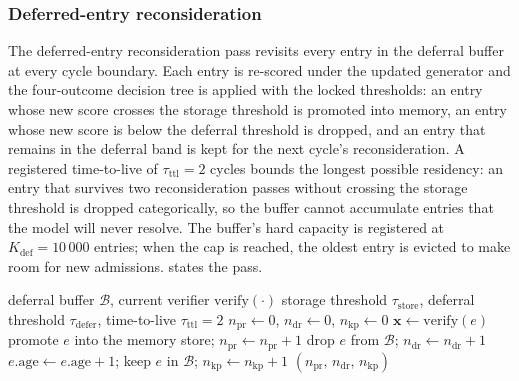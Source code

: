 \subsubsection{Deferred-entry reconsideration}
\label{sec:deferred-reconsider}

The deferred-entry reconsideration pass revisits every entry in the deferral buffer at every cycle boundary. Each entry is re-scored under the updated generator and the four-outcome decision tree is applied with the locked thresholds: an entry whose new score crosses the storage threshold is promoted into memory, an entry whose new score is below the deferral threshold is dropped, and an entry that remains in the deferral band is kept for the next cycle's reconsideration. A registered time-to-live of $\tau_{\text{ttl}} = 2$ cycles bounds the longest possible residency: an entry that survives two reconsideration passes without crossing the storage threshold is dropped categorically, so the buffer cannot accumulate entries that the model will never resolve. The buffer's hard capacity is registered at $K_{\text{def}} = 10\,000$ entries; when the cap is reached, the oldest entry is evicted to make room for new admissions.  states the pass.

\begin{algorithm}[!htbp]
\caption[Deferred-entry reconsideration pass (Stage~8b).]{Deferred-entry reconsideration pass (Stage~8b).}
\label{alg:deferred-reconsider}
\begin{algorithmic}[1]
\Require deferral buffer $\mathcal{B}$, current verifier $\mathrm{verify}(\cdot)$
\Require storage threshold $\tau_{\text{store}}$, deferral threshold $\tau_{\text{defer}}$, time-to-live $\tau_{\text{ttl}} = 2$
\State $n_{\text{pr}} \gets 0$, $n_{\text{dr}} \gets 0$, $n_{\text{kp}} \gets 0$
    \State $\mathbf{x} \gets \mathrm{verify}(e)$
        \State promote $e$ into the memory store; $n_{\text{pr}} \gets n_{\text{pr}} + 1$
        \State drop $e$ from $\mathcal{B}$; $n_{\text{dr}} \gets n_{\text{dr}} + 1$
    \Else
        \State $e.\mathrm{age} \gets e.\mathrm{age} + 1$; keep $e$ in $\mathcal{B}$; $n_{\text{kp}} \gets n_{\text{kp}} + 1$
    \EndIf
\EndFor
\State \Return $(n_{\text{pr}},\, n_{\text{dr}},\, n_{\text{kp}})$
\end{algorithmic}
\end{algorithm}


